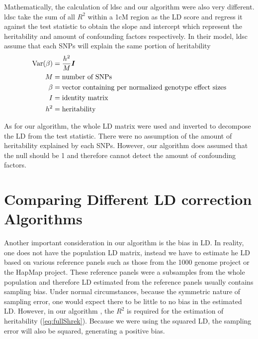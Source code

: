 			Mathematically, the calculation of \gls{ldsc} and our algorithm were also very different. 
			\gls{ldsc} take the sum of all $R^2$ within a 1cM region as the LD score and regress it against the test statistic to obtain the slope and intercept which represent the heritability and amount of confounding factors respectively. 
			In their model, \gls{ldsc} assume that each \glspl{SNP} will explain the same portion of heritability
			\begin{align}
			 \mathrm{Var}(\beta)&=\frac{h^2}{M}\boldsymbol{I}\\
			 M &= \text{number of SNPs}\notag\\
			 \beta &= \text{vector containing per normalized genotype effect sizes}\notag\\
			 I &= \text{identity matrix}\notag\\
			 h^2 &= \text{heritability}\notag
			\end{align}
			
			As for our algorithm, the whole \gls{LD} matrix were used and inverted to decompose the \gls{LD} from the test statistic. 
			There were no assumption of the amount of heritability explained by each \glspl{SNP}. 
			However, our algorithm does assumed that the null should be 1 and therefore cannot detect the amount of confounding factors. 
			
	\section{Comparing Different LD correction Algorithms}
		\label{sec:ldSim}
		Another important consideration in our algorithm is the bias in \gls{LD}.
		In reality, one does not have the population \gls{LD} matrix, instead we have to estimate he \gls{LD} based on various reference panels such as those from the 1000 genome project\citep{Project2012} or the HapMap project\citep{Altshuler2010}.
		These reference panels were a subsamples from the whole population and therefore \gls{LD} estimated from the reference panels usually contains sampling bias.
		Under normal circumstances, because the symmetric nature of sampling error, one would expect there to be little to no bias in the estimated \gls{LD}.
		However, in our algorithm , the $R^2$ is required for the estimation of heritability (\cref{eq:fullShrek}).
		Because we were using the squared \gls{LD}, the sampling error will also be squared, generating a positive bias. 
		
